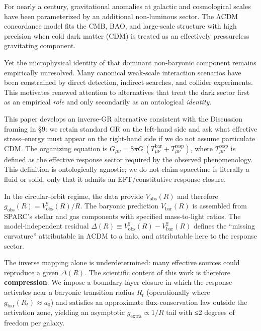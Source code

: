 For nearly a century, gravitational anomalies at galactic and cosmological scales have been parameterized by an additional non-luminous sector. The ΛCDM concordance model fits the CMB, BAO, and large-scale structure with high precision when cold dark matter (CDM) is treated as an effectively pressureless gravitating component.

Yet the microphysical identity of that dominant non-baryonic component remains empirically unresolved. Many canonical weak-scale interaction scenarios have been constrained by direct detection, indirect searches, and collider experiments. This motivates renewed attention to alternatives that treat the dark sector first as an empirical \emph{role} and only secondarily as an ontological \emph{identity}.

This paper develops an inverse-GR alternative consistent with the Discussion framing in §9: we retain standard GR on the left-hand side and ask what effective stress--energy must appear on the right-hand side if we do not assume particulate CDM. The organizing equation is \(G_{\mu\nu} = 8\pi G\,\left( T_{\mu\nu}^{\text{bar}} + T_{\mu\nu}^{\text{resp}} \right)\), where \(T_{\mu\nu}^{\text{resp}}\) is defined as the effective response sector required by the observed phenomenology. This definition is ontologically agnostic; we do not claim spacetime is literally a fluid or solid, only that it admits an EFT/constitutive response closure.

In the circular-orbit regime, the data provide \(V_{\text{obs}}(R)\) and therefore \(g_{\text{obs}}(R) = V_{\text{obs}}^{2}(R)\text{/}R\). The baryonic prediction \(V_{\text{bar}}(R)\) is assembled from SPARC's stellar and gas components with specified mass-to-light ratios. The model-independent residual \(\Delta(R) \equiv V_{\text{obs}}^{2}(R) - V_{\text{bar}}^{2}(R)\) defines the ``missing curvature'' attributable in ΛCDM to a halo, and attributable here to the response sector.

The inverse mapping alone is underdetermined: many effective sources could reproduce a given \(\Delta(R)\). The scientific content of this work is therefore \textbf{compression}. We impose a boundary-layer closure in which the response activates near a baryonic transition radius \(R_{t}\) (operationally where \(g_{\text{bar}}\left( R_{t} \right) \approx a_{0}\)) and satisfies an approximate flux-conservation law outside the activation zone, yielding an asymptotic \(g_{\text{extra}} \propto 1\text{/}R\) tail with ≤2 degrees of freedom per galaxy.

